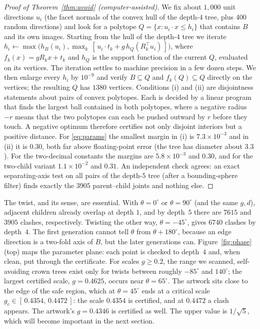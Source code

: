 \documentclass[12pt]{article}
\theoremstyle{plain}
\theoremstyle{remark}
\newcommand{\GCLO}{0.4354}
\newcommand{\GCHI}{0.4472}
\begin{document}
\begin{proof}[Proof of Theorem~\ref{thm:avoid} (computer-assisted)]
We fix about $1{,}000$ unit directions $u_i$ (the facet normals of the convex
hull of the depth-$4$ tree, plus $400$ random directions) and look for a
polytope $Q=\{x: u_i\cdot x\le h_i\}$ that contains $B$ and its own images.
Starting from the hull of the depth-$4$ tree we iterate
$h_i\leftarrow\max\bigl(h_B(u_i),\max_k\,[\,u_i\cdot t_k+g\,h_Q(R_k^{\top}u_i)\,]\bigr)$,
where $f_k(x)=gR_kx+t_k$ and $h_Q$ is the support function of the current
$Q$, evaluated on its vertices.  The iteration settles to machine precision in
a few dozen steps.  We then enlarge every $h_i$ by $10^{-9}$ and verify
$B\subseteq Q$ and $f_k(Q)\subseteq Q$ directly on the vertices; the resulting
$Q$ has $1380$ vertices.  Conditions (i) and (ii) are disjointness statements
about pairs of convex polytopes.  Each is decided by a linear program that
finds the largest ball contained in both polytopes, where a negative radius
$-r$ means that the two polytopes can each be pushed outward by $r$ before
they touch.  A negative optimum therefore certifies not only disjoint
interiors but a positive distance.  For \eqref{eq:params} the smallest margin
in (i) is $7.3\times10^{-3}$ and in (ii) it is $0.30$, both far above
floating-point error (the tree has diameter about $3.3$).  For the two-decimal
constants the margins are $5.8\times10^{-3}$ and $0.30$, and for the two-child
variant $1.1\times10^{-2}$ and $0.31$.  An independent check agrees: an exact
separating-axis test on all pairs of the depth-$5$ tree (after a
bounding-sphere filter) finds exactly the $3905$ parent--child joints and
nothing else.
\end{proof}

The twist, and its sense, are essential.  With $\theta=0^\circ$ or
$\theta=90^\circ$ (and the same $g,d$), adjacent children already overlap at
depth $1$, and by depth~$5$ there are $7615$ and $3905$ clashes, respectively.
Twisting the other way, $\theta=-45^\circ$, gives $6740$ clashes by depth~$4$.
The first generation cannot tell $\theta$ from $\theta+180^\circ$, because an
edge direction is a two-fold axis of $B$, but the later generations can.
Figure~\ref{fig:phase} (top) maps the parameter plane: each point is checked to
depth~$4$ and, when clean, put through the certificate.  For scales
$g\ge0.2$, the range we scanned, self-avoiding crown trees exist only for
twists between roughly $-85^\circ$ and $140^\circ$; the largest certified
scale, $g=0.4625$, occurs near $\theta=65^\circ$.  The artwork sits close to
the edge of the safe region, which at $\theta=45^\circ$ ends at a critical
scale $g_c\in[\,\GCLO,\,\GCHI\,]$: the scale $\GCLO$ is certified, and at
$\GCHI$ a clash appears.  The artwork's $g=0.4346$ is certified as well.  The
upper value is $1/\sqrt5$, which will become important in the next section.
\end{document}
